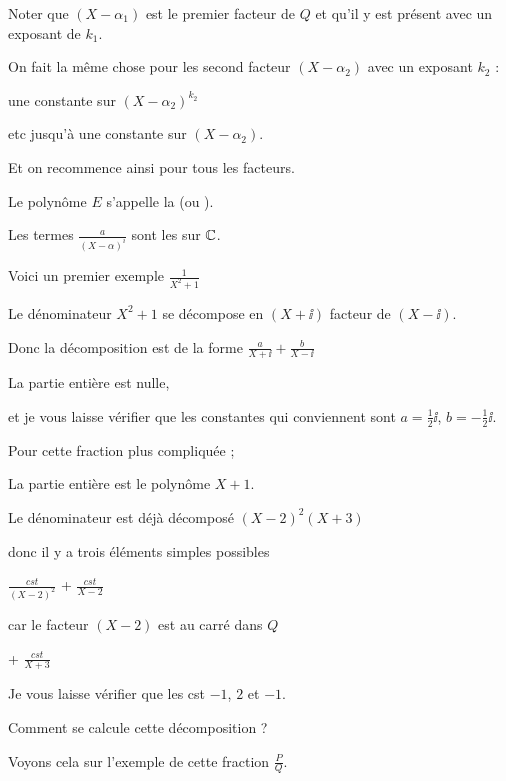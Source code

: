 Noter que $(X-\alpha_1)$ est le premier facteur de $Q$ et qu'il y est présent avec un exposant de $k_1$.

On fait la même chose pour les second facteur $(X-\alpha_2)$ avec un exposant $k_2$ :

une constante sur $(X-\alpha_2)^{k_2}$

etc jusqu'à une constante sur $(X-\alpha_2)$.

Et on recommence ainsi pour tous les facteurs.



\change

Le polynôme $E$ s'appelle la  (ou ).

\change

Les termes $\frac{a}{(X-\alpha)^i}$ sont les  sur $\mathbb{C}$.

\change


Voici un premier exemple
 $\frac{1}{X^2+1}$
 
 Le dénominateur $X^2+1$ se décompose en $(X+\ii)$ facteur de $(X-\ii)$.
 
 Donc la décomposition est de la forme  $\frac{a}{X+\ii} + \frac{b}{X-\ii}$ 
 
 La partie entière est nulle,
 
 et je vous laisse vérifier que les constantes qui conviennent sont $a=\frac12 \ii$, $b=-\frac12\ii$.
 
 
 \change
 
Pour cette fraction plus compliquée ;

La partie entière est le polynôme $X+1$.

Le dénominateur est déjà décomposé $(X-2)^2(X+3)$

donc il y a trois éléments simples possibles 

$\frac{cst}{(X-2)^2}$ + $\frac{cst}{X-2}$ 

car le facteur $(X-2)$ est au carré dans $Q$


+ $\frac{cst}{X+3}$

Je vous laisse vérifier que les cst $-1$, $2$ et $-1$.


\diapo

Comment se calcule cette décomposition ?

Voyons cela sur l'exemple de cette fraction $\frac{P}{Q}$.



\change

